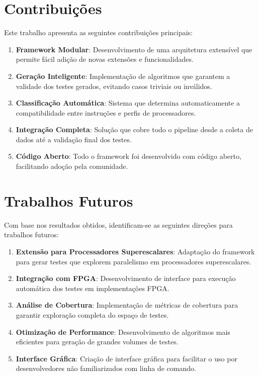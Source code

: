 \documentclass[12pt,a4paper]{article}
\begin{document}
\section{Contribuições}

Este trabalho apresenta as seguintes contribuições principais:

\begin{enumerate}
    \item \textbf{Framework Modular}: Desenvolvimento de uma arquitetura extensível que permite fácil adição de novas extensões e funcionalidades.
    
    \item \textbf{Geração Inteligente}: Implementação de algoritmos que garantem a validade dos testes gerados, evitando casos triviais ou inválidos.
    
    \item \textbf{Classificação Automática}: Sistema que determina automaticamente a compatibilidade entre instruções e perfis de processadores.
    
    \item \textbf{Integração Completa}: Solução que cobre todo o pipeline desde a coleta de dados até a validação final dos testes.
    
    \item \textbf{Código Aberto}: Todo o framework foi desenvolvido com código aberto, facilitando adoção pela comunidade.
\end{enumerate}

\section{Trabalhos Futuros}

Com base nos resultados obtidos, identificam-se as seguintes direções para trabalhos futuros:

\begin{enumerate}
    \item \textbf{Extensão para Processadores Superescalares}: Adaptação do framework para gerar testes que explorem paralelismo em processadores superescalares.
    
    \item \textbf{Integração com FPGA}: Desenvolvimento de interface para execução automática dos testes em implementações FPGA.
    
    \item \textbf{Análise de Cobertura}: Implementação de métricas de cobertura para garantir exploração completa do espaço de testes.
    
    \item \textbf{Otimização de Performance}: Desenvolvimento de algoritmos mais eficientes para geração de grandes volumes de testes.
    
    \item \textbf{Interface Gráfica}: Criação de interface gráfica para facilitar o uso por desenvolvedores não familiarizados com linha de comando.
\end{enumerate}
\end{document}
